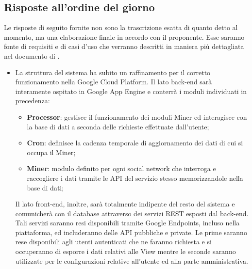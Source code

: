 \subsection{Risposte all'ordine del giorno}
Le risposte di seguito fornite non sono la trascrizione esatta di quanto detto al momento, ma una elaborazione
finale in accordo con il proponente. \newline
Esse saranno fonte di requisiti e di casi d'uso che verranno descritti in maniera più dettagliata nel documento di \docNameVersionAdR.
\begin{itemize}
  \item La struttura del sistema ha subito un raffinamento per il corretto funzionamento nella Google Cloud Platform.
  Il lato back-end sarà interamente ospitato in Google App Engine e conterrà i moduli individuati in precedenza:
  \begin{itemize}
    \item \textbf{Processor}: gestisce il funzionamento dei moduli Miner ed interagisce con la base di dati a seconda
    delle richieste effettuate dall'utente;
    \item \textbf{Cron}: definisce la cadenza temporale di aggiornamento dei dati di cui si occupa il Miner;
    \item \textbf{Miner}: modulo definito per ogni social network che interroga e raccogliere i dati tramite le
    API del servizio stesso memorizzandole nella base di dati;
  \end{itemize}
  Il lato front-end, inoltre, sarà totalmente indipente del resto del sistema e comunicherà con il database attraverso
  dei servizi REST esposti dal back-end. Tali servizi saranno resi disponibili tramite Google Endpoints, incluso nella
  piattaforma, ed includeranno delle API pubbliche e private. Le prime saranno rese disponibili agli utenti autenticati che
  ne faranno richiesta e si occuperanno di esporre i dati relativi alle View mentre le seconde saranno utilizzate per
  le configurazioni relative all'utente ed alla parte amministrativa.


\end{itemize}
